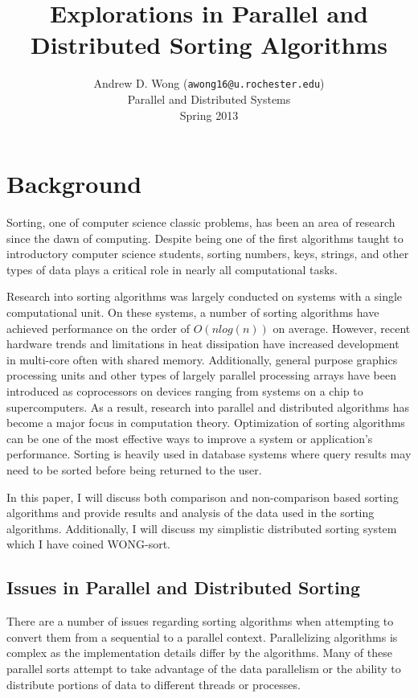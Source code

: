\documentclass[11pt,letterpaper]{article}
\title{Explorations in Parallel and Distributed Sorting Algorithms}
\author{Andrew D. Wong (\texttt{awong16@u.rochester.edu})\\
	Parallel and Distributed Systems\\
	Spring 2013\\
}
\begin{document}
\belowcaptionskip=-10pt
\maketitle

\section{Background}
Sorting, one of computer science classic problems, has been an area of research
since the dawn of computing.  Despite being one of the first algorithms taught
to introductory computer science students, sorting numbers, keys, strings, and
other types of data plays a critical role in nearly all computational tasks.
\par
Research into sorting algorithms was largely conducted on systems with a single
computational unit.  On these systems, a number of sorting algorithms have
achieved performance on the order of $O(n log(n))$ on average.  However, recent
hardware trends and limitations in heat dissipation have increased development
in multi-core often with shared memory.  Additionally, general purpose graphics
processing units and other types of largely parallel processing arrays have been
introduced as coprocessors on devices ranging from systems on a chip to
supercomputers.   As a result, research into parallel and distributed algorithms
has become a major focus in computation theory.  Optimization of sorting
algorithms can be one of the most effective ways to improve a system or
application's performance.  Sorting is heavily used in database systems where
query results may need to be sorted before being returned to the user.
\par
In this paper, I will discuss both comparison and non-comparison based sorting
algorithms and provide results and analysis of the data used in the sorting
algorithms.  Additionally, I will discuss my simplistic distributed sorting
system which I have coined WONG-sort.

\subsection{Issues in Parallel and Distributed Sorting}
There are a number of issues regarding sorting algorithms when attempting to
convert them from a sequential to a parallel context.  Parallelizing algorithms
is complex as the implementation details differ by the algorithms.  Many of
these parallel sorts attempt to take advantage of the data parallelism or the
ability to distribute portions of data to different threads or processes.
\end{document}
